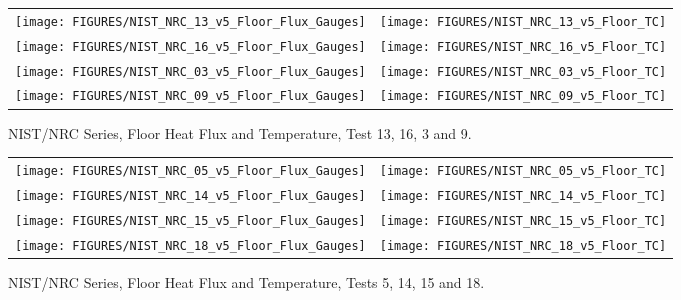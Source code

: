 \begin{figure}[p]
\begin{tabular*}{\textwidth}{l@{\extracolsep{\fill}}r}
\texttt{[image: FIGURES/NIST\_NRC\_13\_v5\_Floor\_Flux\_Gauges]} &
\texttt{[image: FIGURES/NIST\_NRC\_13\_v5\_Floor\_TC]} \\
\texttt{[image: FIGURES/NIST\_NRC\_16\_v5\_Floor\_Flux\_Gauges]} &
\texttt{[image: FIGURES/NIST\_NRC\_16\_v5\_Floor\_TC]} \\
\texttt{[image: FIGURES/NIST\_NRC\_03\_v5\_Floor\_Flux\_Gauges]} &
\texttt{[image: FIGURES/NIST\_NRC\_03\_v5\_Floor\_TC]} \\
\texttt{[image: FIGURES/NIST\_NRC\_09\_v5\_Floor\_Flux\_Gauges]} &
\texttt{[image: FIGURES/NIST\_NRC\_09\_v5\_Floor\_TC]}

\end{tabular*}
\caption{NIST/NRC Series, Floor Heat Flux and Temperature, Test 13, 16, 3 and 9.}
\label{NIST_NRC_Floor_3}
\end{figure}

\begin{figure}[p]
\begin{tabular*}{\textwidth}{l@{\extracolsep{\fill}}r}
\texttt{[image: FIGURES/NIST\_NRC\_05\_v5\_Floor\_Flux\_Gauges]} &
\texttt{[image: FIGURES/NIST\_NRC\_05\_v5\_Floor\_TC]} \\
\texttt{[image: FIGURES/NIST\_NRC\_14\_v5\_Floor\_Flux\_Gauges]} &
\texttt{[image: FIGURES/NIST\_NRC\_14\_v5\_Floor\_TC]} \\
\texttt{[image: FIGURES/NIST\_NRC\_15\_v5\_Floor\_Flux\_Gauges]} &
\texttt{[image: FIGURES/NIST\_NRC\_15\_v5\_Floor\_TC]} \\
\texttt{[image: FIGURES/NIST\_NRC\_18\_v5\_Floor\_Flux\_Gauges]} &
\texttt{[image: FIGURES/NIST\_NRC\_18\_v5\_Floor\_TC]}
\end{tabular*}
\caption{NIST/NRC Series, Floor Heat Flux and Temperature, Tests 5, 14, 15 and 18.}
\label{NIST_NRC_Floor_4}
\end{figure}

\clearpage
